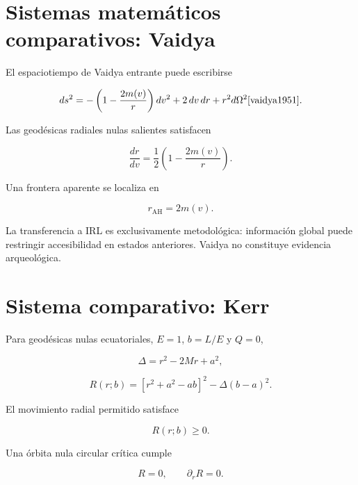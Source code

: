 
\section{Sistemas matemáticos comparativos: Vaidya}

El espaciotiempo de Vaidya entrante puede escribirse

\begin{equation}
ds^2
=
-
\left(
1-\frac{2m(v)}{r}
\right)
dv^2
+
2\,dv\,dr
+
r^2d\Omega^2
\cite{vaidya1951}.
\end{equation}

Las geodésicas radiales nulas salientes satisfacen

\begin{equation}
\boxed{
\frac{dr}{dv}
=
\frac12
\left(
1-\frac{2m(v)}{r}
\right).
}
\end{equation}

Una frontera aparente se localiza en

\begin{equation}
r_{\mathrm{AH}}=2m(v).
\end{equation}

La transferencia a IRL es exclusivamente metodológica: información global puede restringir accesibilidad en estados anteriores. Vaidya no constituye evidencia arqueológica.

\section{Sistema comparativo: Kerr}

Para geodésicas nulas ecuatoriales, \(E=1\), \(b=L/E\) y \(Q=0\),

\begin{equation}
\Delta=r^2-2Mr+a^2,
\end{equation}

\begin{equation}
\boxed{
R(r;b)
=
[r^2+a^2-ab]^2
-
\Delta(b-a)^2.
}
\end{equation}

El movimiento radial permitido satisface

\begin{equation}
R(r;b)\ge0.
\end{equation}

Una órbita nula circular crítica cumple

\begin{equation}
\boxed{
R=0,
\qquad
\partial_rR=0.
}
\end{equation}


